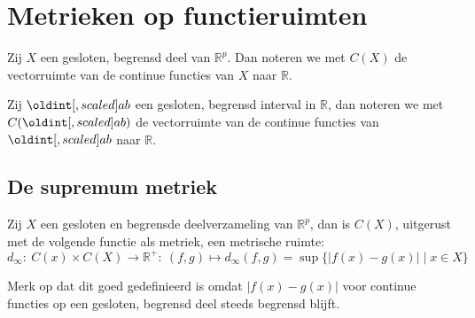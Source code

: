 \documentclass[main.tex]{subfiles}
\begin{document}
\section{Metrieken op functieruimten}
\label{sec:metr-op-funct}

\begin{de}
  Zij $X$ een gesloten, begrensd deel van $\mathbb{R}^{p}$. Dan noteren we met $C(X)$ de vectorruimte van de continue functies van $X$ naar $\mathbb{R}$.
\end{de}

\begin{de}
  Zij $\interval{a}{b}$ een gesloten, begrensd interval in $\mathbb{R}$, dan noteren we met $C(\interval{a}{b})$ de vectorruimte van de continue functies van $\interval{a}{b}$ naar $\mathbb{R}$.
\end{de}

\subsection{De supremum metriek}
\label{sec:supremum-metriek}

\begin{vb}
  Zij $X$ een gesloten en begrensde deelverzameling van $\mathbb{R}^{p}$, dan is $C(X)$, uitgerust met de volgende functie als metriek, een metrische ruimte:
  \[ d_{\infty}:\ C(x)\times C(X)\rightarrow \mathbb{R}^{+}:\ (f,g) \mapsto d_{\infty}(f,g) = \sup \{ |f(x)-g(x)| \mid x \in X \} \]

\end{vb}

\begin{opm}
  Merk op dat dit goed gedefinieerd is omdat $|f(x)-g(x)|$ voor continue functies op een gesloten, begrensd deel steeds begrensd blijft. \needed
\end{opm}
\end{document}
